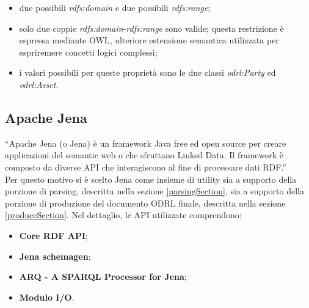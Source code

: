 \documentclass[12pt,a4paper,twoside]{book}
\begin{document}
\begin{itemize}
\item due possibili \textit{rdfs:domain} e due possibili \textit{rdfs:range};
\item solo due coppie \textit{rdfs:domain}-\textit{rdfs:range} sono valide; questa restrizione è espressa mediante OWL\cite{OWL}, ulteriore estensione semantica utilizzata per espriremere concetti logici complessi;
\item i valori possibili per queste proprietà sono le due classi \textit{odrl:Party} ed \textit{odrl:Asset}.
\end{itemize}
\subsection{Apache Jena}\label{apacheJenaSec}
``Apache Jena (o Jena) è un framework Java free ed open source per creare applicazioni del semantic web o che sfruttano Linked Data. Il framework è composto da diverse API che interagiscono al fine di processare dati RDF.''\cite{Jena}\\
Per questo motivo si è scelto Jena come insieme di utility sia a supporto della porzione di parsing, descritta nella sezione \ref{parsingSection}, sia a supporto della porzione di produzione del documento ODRL finale, descritta nella sezione \ref{produceSection}. Nel dettaglio, le API utilizzate comprendono:
\begin{itemize}
\item \textbf{Core RDF API};
\item \textbf{Jena schemagen};
\item \textbf{ARQ - A SPARQL Processor for Jena};
\item \textbf{Modulo I/O}.
\end{itemize}
\end{document}
